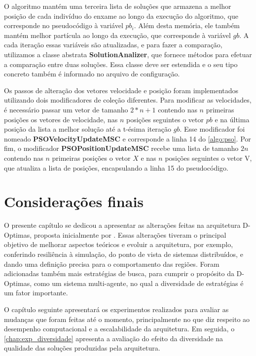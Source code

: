 O algoritmo mantém uma terceira lista de soluções que armazena a melhor posição de cada indivíduo do enxame ao longo da execução do algoritmo, que corresponde no pseudocódigo à variável $pb_i$. Além desta memória, ele também mantém melhor partícula ao longo da execução, que corresponde à variável $gb$. A cada iteração essas variáveis são atualizadas, e para fazer a comparação, utilizamos a classe abstrata  \textbf{SolutionAnalizer}, que fornece métodos para efetuar a comparação entre duas soluções. Essa classe deve ser estendida e o seu tipo concreto também é informado no arquivo de configuração. 

Os passos de alteração dos vetores velocidade e posição foram implementados utilizando dois modificadores de coleção diferentes. Para modificar as velocidades, é necessário passar um vetor de tamanho $2*n + 1$ contendo nas $n$ primeiras posições os vetores de velocidade, nas $n$ posições seguintes o vetor $pb$ e na última posição da lista a melhor solução até a t-ésima iteração $gb$. Esse modificador foi nomeado \textbf{PSOVelocityUpdateMSC} e corresponde a linha 14 do \autoref{algo:pso}. Por fim, o modificador \textbf{PSOPositionUpdateMSC} recebe uma lista de tamanho $2n$ contendo nas $n$ primeiras posições o vetor $X$ e nas $n$ posições seguintes o vetor V, que atualiza a lista de posições, encapsulando a linha 15 do pseudocódigo.

\section{Considerações finais}
O presente capítulo se dedicou a apresentar as alterações feitas na arquitetura D-Optimas, proposta inicialmente por . Essas alterações tiveram o principal objetivo de melhorar aspectos teóricos e evoluir a arquitetura, por exemplo, conferindo resiliência à simulação, do ponto de vista de sistemas distribuídos, e dando uma definição precisa para o comportamento das regiões. Foram adicionadas também mais estratégias de busca, para cumprir o propósito da D-Optimas, como um sistema multi-agente, no qual a diversidade de estratégias é um fator importante.

O capítulo seguinte apresentará os experimentos realizados para avaliar as mudanças que foram feitas até o momento, principalmente no que diz respeito ao desempenho computacional e a escalabilidade da arquitetura. Em seguida, o \autoref{chap:exp_diversidade} apresenta a avaliação do efeito da diversidade na qualidade das soluções produzidas pela arquitetura. 